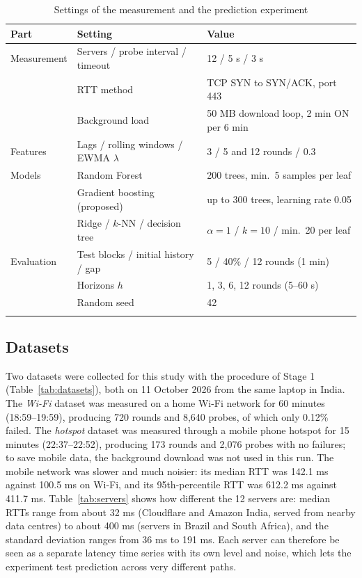 \documentclass[pdflatex,sn-mathphys-num]{sn-jnl}
\begin{document}
\begin{table}[h]
\caption{Settings of the measurement and the prediction experiment}\label{tab:hyper}
\centering
\footnotesize
\begin{tabular}{@{}lll@{}}
\toprule
Part & Setting & Value \\
\midrule
Measurement & Servers / probe interval / timeout & 12 / 5 s / 3 s \\
 & RTT method & TCP SYN to SYN/ACK, port 443 \\
 & Background load & 50 MB download loop, 2 min ON per 6 min \\
Features & Lags / rolling windows / EWMA $\lambda$ & 3 / 5 and 12 rounds / 0.3 \\
Models & Random Forest & 200 trees, min.\ 5 samples per leaf \\
 & Gradient boosting (proposed) & up to 300 trees, learning rate 0.05 \\
 & Ridge / $k$-NN / decision tree & $\alpha = 1$ / $k = 10$ / min.\ 20 per leaf \\
Evaluation & Test blocks / initial history / gap & 5 / 40\% / 12 rounds (1 min) \\
 & Horizons $h$ & 1, 3, 6, 12 rounds (5--60 s) \\
 & Random seed & 42 \\
\botrule
\end{tabular}
\end{table}

\subsection{Datasets}\label{sec:datasets}

Two datasets were collected for this study with the procedure of Stage 1 (Table~\ref{tab:datasets}), both on 11 October 2026 from the same laptop in India. The \emph{Wi-Fi} dataset was measured on a home Wi-Fi network for 60 minutes (18:59--19:59), producing 720 rounds and 8{,}640 probes, of which only 0.12\% failed. The \emph{hotspot} dataset was measured through a mobile phone hotspot for 15 minutes (22:37--22:52), producing 173 rounds and 2{,}076 probes with no failures; to save mobile data, the background download was not used in this run. The mobile network was slower and much noisier: its median RTT was 142.1 ms against 100.5 ms on Wi-Fi, and its 95th-percentile RTT was 612.2 ms against 411.7 ms. Table~\ref{tab:servers} shows how different the 12 servers are: median RTTs range from about 32 ms (Cloudflare and Amazon India, served from nearby data centres) to about 400 ms (servers in Brazil and South Africa), and the standard deviation ranges from 36 ms to 191 ms. Each server can therefore be seen as a separate latency time series with its own level and noise, which lets the experiment test prediction across very different paths.
\end{document}
